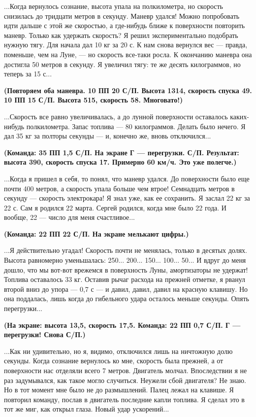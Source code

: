 \documentclass[11pt,a4paper,oneside]{article}
\begin{document}
...Когда вернулось сознание, высота упала на полкилометра, но скорость снизилась до тридцати метров в секунду. Маневр удался! Можно попробовать идти дальше с этой же скоростью, а где-нибудь ближе к поверхности повторить маневр. Только как удержать скорость? Я решил экспериментально подобрать нужную тягу. Для начала дал 10 кг за 20 с. К нам снова вернулся вес — правда, поменьше, чем на Луне, — но скорость все-таки росла. К окончанию маневра она достигла 50 метров в секунду. Я увеличил тягу: те же десять килограммов, но теперь за 15 с...

\textbf{
(Повторяем оба маневра. 10 ПП 20 С/П. Высота 1314, скорость спуска 49. 10 ПП 15 С/П. Высота 515, скорость 58. Многовато!)}

...Скорость все равно увеличивалась, а до лунной поверхности оставалось каких-нибудь полкилометра. Запас топлива — 80 килограммов. Делать было нечего. Я дал 35 кг за полторы секунды — и, конечно же, вновь отключился...

\textbf{
(Команда: 35 ПП 1,5 С/П. На экране Г — перегрузки. С/П. Результат: высота 390, скорость спуска 17. Примерно 60 км/ч. Это уже полегче.)}

...Когда я пришел в себя, то понял, что маневр удался. До поверхности было еще почти 400 метров, а скорость упала больше чем втрое! Семнадцать метров в секунду — скорость электрокара! Я знал уже, как ее сохранить. Я заслал 22 кг за 22 с. Сам я родился 22 марта. Сергей родился, когда мне было 22 года. И вообще, 22 — число для меня счастливое...

\textbf{
(Команда: 22 ПП 22 С/П. На экране мелькают цифры.)}

...Я действительно угадал! Скорость почти не менялась, только в десятых долях. Высота равномерно уменьшалась: 250... 200... 150... 100... 50... И вдруг до меня дошло, что мы вот-вот врежемся в поверхность Луны, амортизаторы не удержат! Топлива оставалось 33 кг. Оставив рычаг расхода на прежней отметке, я рванул второй вниз до упора — 0,7 с — и давил, давил, давил на красную клавишу. Но она поддалась, лишь когда до гибельного удара осталось меньше секунды. Опять перегрузки...

\textbf{
(На экране: высота 13,5, скорость 17,5. Команда: 22 ПП 0,7 С/П. Г — перегрузки! Снова С/П.)}

...Как ни удивительно, но я, видимо, отключился лишь на ничтожную долю секунды. Когда сознание вернулось ко мне, скорость была прежней, а от поверхности нас отделяли всего 7 метров. Двигатель молчал. Впоследствии я не раз задумывался, как такое могло случиться. Неужели сбой двигателя? Не знаю. Но в тот момент мне было не до размышлений. Палец лежал на клавише. Я повторил команду, послав в двигатель последние капли топлива. Я сделал это в тот же миг, как открыл глаза. Новый удар ускорений...
\end{document}
